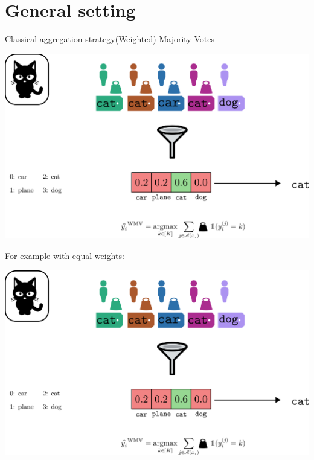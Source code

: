 \section{General setting}

\begin{frame}{Classical aggregation strategy}{(Weighted) Majority Votes}
    \begin{center}
        \includegraphics[width=.8\textwidth, clip, trim={50cm 0cm 30cm 75cm}]{./images/MV_label.pdf}
    \end{center}

        For example with equal weights:

    \begin{center}
        \includegraphics[width=\textwidth, clip, trim={0cm 10cm 0cm 0cm}]{./images/MV_label.pdf}
    \end{center}

\end{frame}

